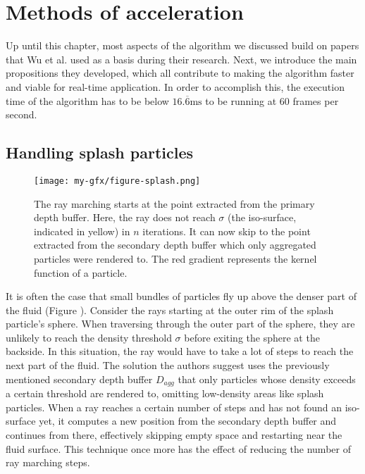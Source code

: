 %
\chapter{Methods of acceleration}
\label{sec:acceleration}

Up until this chapter, most aspects of the algorithm we discussed build on papers that Wu et al. used as a basis during their research. Next, we introduce the main propositions they developed, which all contribute to making the algorithm faster and viable for real-time application. In order to accomplish this, the execution time of the algorithm has to be below $16.\overline{6}\text{ms}$ to be running at $60$ frames per second.

\section{Handling splash particles}
\label{sec:splashparticles}

\begin{figure}[h]
    \centering
    \texttt{[image: my-gfx/figure-splash.png]}
    \caption{The ray marching starts at the point extracted from the primary depth buffer. Here, the ray does not reach $\sigma$ (the iso-surface, indicated in yellow) in $n$ iterations. It can now skip to the point extracted from the secondary depth buffer which only aggregated particles were rendered to. The red gradient represents the kernel function of a particle.}
    \label{fig:splash}
\end{figure}

It is often the case that small bundles of particles fly up above the denser part of the fluid (Figure ). Consider the rays starting at the outer rim of the splash particle's sphere. When traversing through the outer part of the sphere, they are unlikely to reach the density threshold $\sigma$ before exiting the sphere at the backside. In this situation, the ray would have to take a lot of steps to reach the next part of the fluid. The solution the authors suggest uses the previously mentioned secondary depth buffer $D_{agg}$ that only particles whose density exceeds a certain threshold are rendered to, omitting low-density areas like splash particles. When a ray reaches a certain number of steps and has not found an iso-surface yet, it computes a new position from the secondary depth buffer and continues from there, effectively skipping empty space and restarting near the fluid surface. This technique once more has the effect of reducing the number of ray marching steps.

